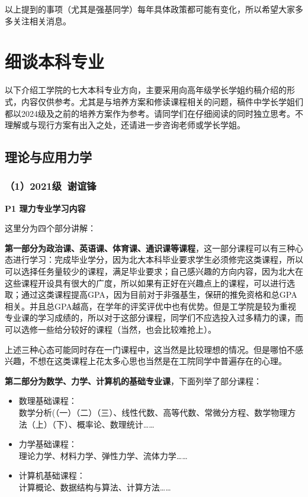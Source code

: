 \documentclass[11pt,oneside]{book}
\begin{document}
以上提到的事项（尤其是强基同学）每年具体政策都可能有变化，所以希望大家多多关注相关消息。

 
\section{细谈本科专业}
以下介绍工学院的七大本科专业方向，主要采用向高年级学长学姐约稿介绍的形式，内容仅供参考。尤其是与培养方案和修读课程相关的问题，稿件中学长学姐们都以2024级及之前的培养方案作为参考。请同学们在仔细阅读的同时独立思考。不理解或与现行方案有出入之处，还请进一步咨询老师或学长学姐。
\subsection{理论与应用力学}
\subsubsection{（1）2021级\ 谢谊锋}
\textbf{P1 理力专业学习内容}

这里分为四个部分讲解：

\vspace{10pt}

\textbf{第一部分为政治课、英语课、体育课、通识课等课程}，这一部分课程可以有三种心态进行学习：完成毕业学分，因为北大本科毕业要求学生必须修完这类课程，所以可以选择任务量较少的课程，满足毕业要求；自己感兴趣的方向内容，因为北大在这些课程开设具有很大的广度，所以如果有正好在兴趣点上的课程，可以进行选取；通过这类课程提高GPA，因为目前对于非强基生，保研的推免资格和总GPA相关。并且总GPA越高，在学年的评奖评优中也有优势。但是工学院是较为重视专业课的学习成绩的，所以对于这部分课程，同学们不应选投入过多精力的课，而可以选修一些给分较好的课程（当然，也会比较难抢上）。

\vspace{10pt}

上述三种心态可能同时存在一门课程中，这当然是比较理想的情况。但是哪怕不感兴趣，不想在这类课程上花太多心思也当然是在工院同学中普遍存在的心理。
 
\vspace{10pt}

\textbf{第二部分为数学、力学、计算机的基础专业课}，下面列举了部分课程：
\begin{itemize}
    \item 数理基础课程：\\数学分析(（一）（二）（三）、线性代数、高等代数、常微分方程、数学物理方法（上）（下）、概率论、数理统计……
    \item 力学基础课程：\\理论力学、材料力学、弹性力学、流体力学……
    \item 计算机基础课程：\\计算概论、数据结构与算法、计算方法……
\end{itemize}
\end{document}

